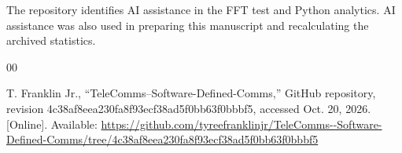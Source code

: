 \documentclass[conference]{IEEEtran}
\begin{document}
The repository identifies AI assistance in the FFT test
and Python analytics. AI assistance was also used in
preparing this manuscript and recalculating the archived
statistics.

\begin{thebibliography}{00}

T. Franklin Jr.,
``TeleComms--Software-Defined-Comms,''
GitHub repository, revision
4c38af8eea230fa8f93ecf38ad5f0bb63f0bbbf5,
accessed Oct. 20, 2026. [Online]. Available:
\url{https://github.com/tyreefranklinjr/TeleComms--Software-Defined-Comms/tree/4c38af8eea230fa8f93ecf38ad5f0bb63f0bbbf5}

\end{thebibliography}
\end{document}
